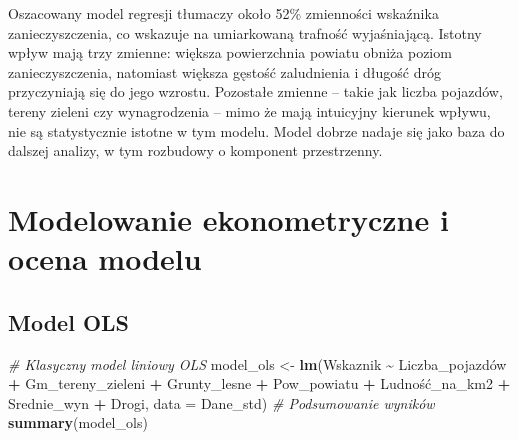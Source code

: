 \documentclass[
  11pt,
]{article}
\newenvironment{Shaded}{\begin{snugshade}}{\end{snugshade}}
\newcommand{\AttributeTok}[1]{\textcolor[rgb]{0.13,0.29,0.53}{#1}}
\newcommand{\CommentTok}[1]{\textcolor[rgb]{0.56,0.35,0.01}{\textit{#1}}}
\newcommand{\FunctionTok}[1]{\textcolor[rgb]{0.13,0.29,0.53}{\textbf{#1}}}
\newcommand{\NormalTok}[1]{#1}
\newcommand{\OtherTok}[1]{\textcolor[rgb]{0.56,0.35,0.01}{#1}}
\newcommand{\SpecialCharTok}[1]{\textcolor[rgb]{0.81,0.36,0.00}{\textbf{#1}}}
\begin{document}
Oszacowany model regresji tłumaczy około 52\% zmienności wskaźnika
zanieczyszczenia, co wskazuje na umiarkowaną trafność wyjaśniającą.
Istotny wpływ mają trzy zmienne: większa powierzchnia powiatu obniża
poziom zanieczyszczenia, natomiast większa gęstość zaludnienia i długość
dróg przyczyniają się do jego wzrostu. Pozostałe zmienne -- takie jak
liczba pojazdów, tereny zieleni czy wynagrodzenia -- mimo że mają
intuicyjny kierunek wpływu, nie są statystycznie istotne w tym modelu.
Model dobrze nadaje się jako baza do dalszej analizy, w tym rozbudowy o
komponent przestrzenny.

\section{Modelowanie ekonometryczne i ocena
modelu}\label{modelowanie-ekonometryczne-i-ocena-modelu}

\subsection{Model OLS}\label{model-ols}

\begin{Shaded}
\begin{Highlighting}[]
\CommentTok{\# Klasyczny model liniowy OLS}
\NormalTok{model\_ols }\OtherTok{\textless{}{-}} \FunctionTok{lm}\NormalTok{(Wskaznik }\SpecialCharTok{\textasciitilde{}}\NormalTok{ Liczba\_pojazdów }\SpecialCharTok{+}
\NormalTok{                  Gm\_tereny\_zieleni }\SpecialCharTok{+}
\NormalTok{                  Grunty\_lesne }\SpecialCharTok{+}
\NormalTok{                  Pow\_powiatu }\SpecialCharTok{+}
\NormalTok{                  Ludność\_na\_km2 }\SpecialCharTok{+}
\NormalTok{                  Srednie\_wyn }\SpecialCharTok{+}
\NormalTok{                  Drogi,}
                \AttributeTok{data =}\NormalTok{ Dane\_std)}
\CommentTok{\# Podsumowanie wyników}
\FunctionTok{summary}\NormalTok{(model\_ols)}
\end{Highlighting}
\end{Shaded}
\end{document}
